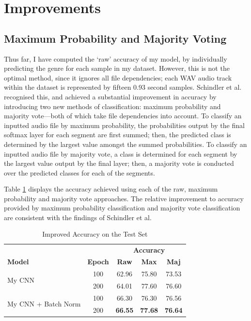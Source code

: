 \documentclass[conference]{IEEEtran}
\begin{document}
\section{Improvements}

\subsection{Maximum Probability and Majority Voting}

Thus far, I have computed the `raw' accuracy of my model, by individually predicting the genre for each sample in my dataset.
However, this is not the optimal method, since it ignores all file dependencies; each WAV audio track within the dataset is represented by fifteen 0.93 second samples.
Schindler et al. recognised this, and achieved a substantial improvement in accuracy by introducing two new methods of classification: maximum probability and majority vote---both of which take file dependencies into account.
To classify an inputted audio file by maximum probability, the probabilities output by the final softmax layer for each segment are first summed; then, the predicted class is determined by the largest value amongst the summed probabilities.
To classify an inputted audio file by majority vote, a class is determined for each segment by the largest value output by the final layer; then, a majority vote is conducted over the predicted classes for each of the segments.

Table \ref{improved_results} displays the accuracy achieved using each of the raw, maximum probability and majority vote approaches.
The relative improvement to accuracy provided by maximum probability classification and majority vote classification are consistent with the findings of Schindler et al.

\begin{table}[htbp]
    \caption{Improved Accuracy on the Test Set}
    \begin{center}
    \begin{tabular}{l c c c c}
    \toprule
    &&\multicolumn{3}{c}{\textbf{Accuracy}}\\
    \cmidrule(lr){3-5}
    \textbf{Model}&\textbf{Epoch}&\textbf{Raw}&\textbf{Max}&\textbf{Maj}\\
    \midrule
    \multirow{ 2}{*}{My CNN} & 100 & 62.96 & 75.80 & 73.53 \\
    & 200 & 64.01 & 77.60 & 76.60 \\
    \midrule
    \multirow{ 2}{*}{My CNN + Batch Norm} & 100 & 66.30 & 76.30 & 76.56 \\
    & 200 & \textbf{66.55} & \textbf{77.68} & \textbf{76.64} \\
    \bottomrule
    \end{tabular}
    \label{improved_results}
    \end{center}
\end{table}
\end{document}
